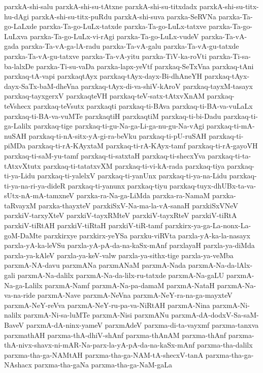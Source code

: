 {parxkA-shi-salu
parxkA-shi-su-tAtxne
parxkA-shi-su-titxdadx
parxkA-shi-su-titx-hu-dAgi
parxkA-shi-su-titx-puRdu
parxkA-shi-suva
parxka-SeRVNa
parxka-Ta-go-LaLxde
parxka-Ta-go-LuLx-tatxde
parxka-Ta-go-LuLx-tatxve
parxka-Ta-go-LuLxva
parxka-Ta-go-LuLx-vi-rAgi
parxka-Ta-go-LuLx-vudeV
parxka-Ta-vA-gada
parxka-Ta-vA-ga-lA-radu
parxka-Ta-vA-galu
parxka-Ta-vA-gu-tatxde
parxka-Ta-vA-gu-tatxve
parxka-Ta-vA-yitu
parxka-TiV-ka-roVti
parxka-Ti-sa-ba-lalxDe
parxka-Ti-su-vaDa
parxka-lapx-yeVtf
parxkaq-SeTxVna
parxkaq-tAni
parxkaq-tA-vapi
parxkaqtAyx
parxkaq-tAyx-dayx-Bi-dhAneYH
parxkaq-tAyx-dayx-SaTx-baM-dheVna
parxkaq-tAyx-di-va-shiV-kAroV
parxkaq-tayxM-tasayx
parxkaq-tayxgerxV
parxkaqteVH
parxkaq-teV-satx-tAtxvXnAM
parxkaq-teVshecx
parxkaq-teVsutx
parxkaqti
parxkaq-ti-BAva
parxkaq-ti-BA-va-vuLaLx
parxkaq-ti-BA-va-vuMTe
parxkaqtiH
parxkaqtiM
parxkaq-ti-bi-Dadu
parxkaq-ti-ga-Lalilx
parxkaq-tige
parxkaq-ti-gu-Na-ga-Li-ga-nu-gu-Na-vAgi
parxkaq-ti-mA-nuSAH
parxkaq-ti-nA-sitx-yA-gi-ra-beVku
parxkaq-ti-pU-ruSAH
parxkaq-ti-piMDa
parxkaq-ti-rA-KAyxtaM
parxkaq-ti-rA-KAyx-tamf
parxkaq-ti-rA-gayoVH
parxkaq-ti-saM-yu-tamf
parxkaq-ti-satxtaH
parxkaq-ti-shecxYva
parxkaq-ti-ta-tAtxvXtutx
parxkaq-ti-tatatxvXM
parxkaq-ti-vi-kA-rada
parxkaq-tiya
parxkaq-ti-ya-Lidu
parxkaq-ti-yalelxV
parxkaq-ti-yanUnx
parxkaq-ti-ya-na-Lidu
parxkaq-ti-ya-na-ri-ya-dideR
parxkaq-ti-yanunx
parxkaq-tiyu
parxkaq-tuyx-dhUBx-ta-va-sUtx-nA-mA-tamxneV
parxka-ra-Na-ga-LiMda
parxka-ra-NamaM
parxka-taRvayxM
parxka-thayxteV
parxkiSxV-Na-ma-la-vA-sanaH
parxkiSxVNeV
parxkiV-tarxyXteV
parxkiV-tayxRMteV
parxkiV-tayxRteV
parxkiV-tiRtA
parxkiV-tiRtAH
parxkiV-tiRtaH
parxkiV-tiR-tamf
parxkirx-ya-ga-La-nonx-La-goM-DaMte
parxkirxye
parxkirx-yeYSa
parxku-viRVta
parxla-yA-ka-la-nasayx
parxla-yA-ka-leVSu
parxla-yA-pA-da-na-kaSx-mAnf
parxlayaH
parxla-ya-diMda
parxla-ya-kAleV
parxla-ya-keV-valw
parxla-ya-sithx-tige
parxla-ya-veMba
parxmA-NA-davu
parxmANa
parxmANaM
parxmA-Nada
parxmA-Na-da-lAlx-gali
parxmA-Na-dalilx
parxmA-Na-da-lilx-ru-tatxde
parxmA-Na-gaLU
parxmA-Na-ga-Lalilx
parxmA-Namf
parxmA-Na-pa-damaM
parxmA-NataH
parxmA-Na-va-na-ride
parxmA-Nave
parxmA-NeVna
parxmA-NeY-ra-na-ga-mayxteV
parxmA-NeY-reVva
parxmA-NeY-ru-pa-va-NiRtAH
parxmA-Nina
parxmA-Ni-nalilx
parxmA-Ni-sa-luMTe
parxmA-Nisi
parxmANu
parxmA-dA-dodxV-Sa-saM-BaveV
parxmA-dA-ninx-yameV
parxmAdeV
parxma-di-ta-vayxmf
parxma-tanxva
parxmathAH
parxma-thA-dhiV-shAnf
parxma-thAnAM
parxma-thAnf
parxma-thA-nivx-shavx-ni-mAR-Na-parx-la-yA-pA-da-na-kaSx-mAnf
parxma-tha-dalilx
parxma-tha-ga-NAMtAH
parxma-tha-ga-NAM-tA-shecxV-tanA
parxma-tha-ga-NAshacx
parxma-tha-gaNa
parxma-tha-ga-NaM-gaLa
}
